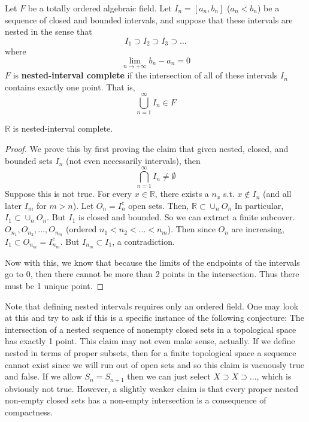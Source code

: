   \begin{definition}
    Let $F$ be a totally ordered algebraic field. Let $I_n= [a_n, b_n]$ ($a_n < b_n$) be a sequence of closed and bounded intervals, and suppose that these intervals are nested in the sense that 
    \begin{equation}
      I_1 \supset I_2 \supset I_3 \supset \ldots
    \end{equation}
    where 
    \begin{equation}
      \lim_{n \rightarrow + \infty} b_n - a_n = 0
    \end{equation}
    $F$ is \textbf{nested-interval complete} if the intersection of all of these intervals $I_n$ contains exactly one point. That is, 
    \[\bigcup_{n=1}^\infty I_n \in F\]
  \end{definition}

  \begin{theorem}
    $\mathbb{R}$ is nested-interval complete. 
  \end{theorem}
  \begin{proof}
    We prove this by first proving the claim that given nested, closed, and bounded sets $I_n$ (not even necessarily intervals), then 
    \begin{equation}
      \bigcap_{n=1}^\infty I_n \neq \emptyset
    \end{equation}
    Suppose this is not true. For every $x \in \mathbb{R}$, there exists a $n_x$ s.t. $x \not\in I_n$ (and all later $I_m$ for $m > n$). Let $O_n = I_n^c$ open sets. Then, $\mathbb{R} \subset \cup_n O_n$ In particular, $I_1 \subset \cup_n O_n$. But $I_1$ is closed and bounded. So we can extract a finite subcover. $O_{n_1}, O_{n_2}, \ldots, O_{n_m}$ (ordered $n_1 < n_2 < \ldots< n_m$). Then since $O_n$ are increasing, $I_1 \subset O_{n_m} = I_{n_m}^c$. But $I_{n_m} \subset I_1$, a contradiction. 

    Now with this, we know that because the limits of the endpoints of the intervals go to $0$, then there cannot be more than 2 points in the intersection. Thus there must be 1 unique point. 
  \end{proof}

  Note that defining nested intervals requires only an ordered field. One may look at this and try to ask if this is a specific instance of the following conjecture: The intersection of a nested sequence of nonempty closed sets in a topological space has exactly 1 point. This claim may not even make sense, actually. If we define nested in terms of proper subsets, then for a finite topological space a sequence cannot exist since we will run out of open sets and so this claim is vacuously true and false. If we allow $S_n = S_{n+1}$ then we can just select $X \supset X \supset \ldots$, which is obviously not true. However, a slightly weaker claim is that every proper nested non-empty closed sets has a non-empty intersection is a consequence of compactness. 

